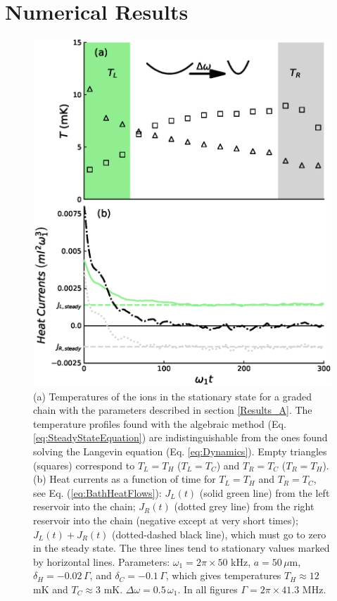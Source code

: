 \section{Numerical Results\label{Numerical Results}}
%
%
%
%
%
\begin{figure}[h]
    \includegraphics[width=\linewidth]{Figures/24Mg_Temperature_Profiles_And_Evolution.eps}
 \caption{(a) Temperatures of the ions in the stationary state for a graded chain with the parameters described in section \ref{Results_A}. The temperature profiles found with the algebraic method (Eq. \eqref{eq:SteadyStateEquation}) are indistinguishable from the ones found solving the Langevin equation (Eq. \eqref{eq:Dynamics}). Empty triangles (squares) correspond to $T_L = T_H$ ($T_L = T_C$) and $T_R = T_C$ ($T_R = T_H$). (b) Heat currents  as a function of time for $T_L = T_H$ and $T_R = T_C$, see Eq. (\ref{eq:BathHeatFlows}): $J_L(t)$ (solid green line) from the left reservoir into the chain;
 $J_R(t)$ (dotted grey line) from the right reservoir into the chain (negative except at very short times); $J_L(t)+J_R(t)$
 (dotted-dashed black line), which must go to zero in the steady state. The three lines tend to stationary values marked by horizontal lines. Parameters: $\omega_1 = 2\pi \times 50$ kHz,
$a=50\, \mu$m,  $\delta_H = -0.02 \, \Gamma$, and $\delta_C = -0.1 \, \Gamma$, which gives temperatures $T_H \approx 12$ mK and $T_C \approx 3$ mK. $\Delta\omega = 0.5 \, \omega_1$. In all figures $\Gamma = 2\pi \times 41.3$ MHz.}
    \label{fig:Temperature_Profiles_Magnesium}
\end{figure}

